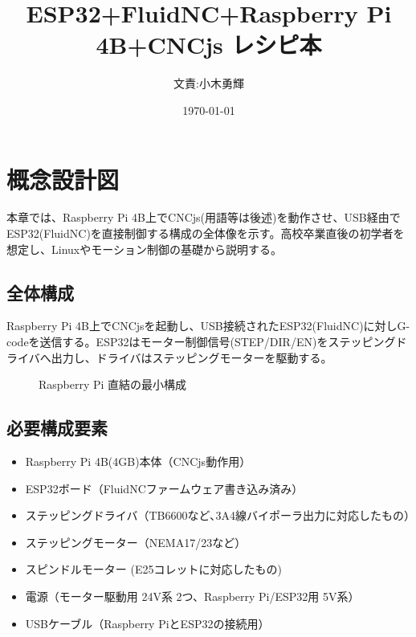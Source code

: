 \documentclass[uplatex,dvipdfmx]{ujarticle}
\begin{document}
\title{ESP32+FluidNC+Raspberry Pi 4B+CNCjs レシピ本}
\author{文責:小木勇輝}
\date{\today}
\maketitle

\tableofcontents


\section{概念設計図}

本章では、Raspberry Pi 4B上でCNCjs(用語等は後述)を動作させ、USB経由でESP32(FluidNC)を直接制御する構成の全体像を示す。高校卒業直後の初学者を想定し、Linuxやモーション制御の基礎から説明する。

\subsection{全体構成}

Raspberry Pi 4B上でCNCjsを起動し、USB接続されたESP32(FluidNC)に対しG-codeを送信する。ESP32はモーター制御信号(STEP/DIR/EN)をステッピングドライバへ出力し、ドライバはステッピングモーターを駆動する。

\begin{figure}[h]
\centering
{}
\caption{Raspberry Pi 直結の最小構成}
\end{figure}

\subsection{必要構成要素}
\begin{itemize}
    \item Raspberry Pi 4B(4GB)本体（CNCjs動作用）
    \item ESP32ボード（FluidNCファームウェア書き込み済み）
    \item ステッピングドライバ（TB6600など､3A4線バイポーラ出力に対応したもの）
    \item ステッピングモーター（NEMA17/23など）
    \item スピンドルモーター (E25コレットに対応したもの)
    \item 電源（モーター駆動用 24V系 2つ、Raspberry Pi/ESP32用 5V系）
    \item USBケーブル（Raspberry PiとESP32の接続用）
\end{itemize}
\end{document}
